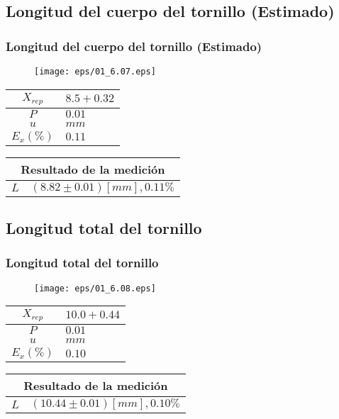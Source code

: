 \documentclass[letter,11pt]{beamer}
\begin{document}
\subsection{Longitud del cuerpo del tornillo (Estimado)}
\begin{frame}
\frametitle{Longitud del cuerpo del tornillo (Estimado)}
\vspace*{0.8cm}
\begin{figure}
\centering
\texttt{[image: eps/01\_6.07.eps]}
\end{figure}
\vspace*{0.4cm}
\scriptsize
\begin{tabular}{|c|>{\centering}m{1.8cm}<{\centering}|}
\hline
$X_{rep}$ &  $8.5+0.32$ \tabularnewline \hline
      $P$ &      $0.01$ \tabularnewline \hline
      $u$ &        $mm$ \tabularnewline \hline
$E_x(\%)$ &      $0.11$ \tabularnewline \hline
\end{tabular}
\quad
\begin{tabular}{|c|>{\centering}m{5.7cm}<{\centering}|}
\hline
\multicolumn{2}{|c|}{\textbf{Resultado de la medición}} \\ \hline
$L$ & $( 8.82\pm0.01)[mm], 0.11\%$ \tabularnewline \hline
\end{tabular}
\end{frame}

\subsection{Longitud total del tornillo}
\begin{frame}
\frametitle{Longitud total del tornillo}
\vspace*{0.8cm}
\begin{figure}
\centering
\texttt{[image: eps/01\_6.08.eps]}
\end{figure}
\vspace*{0.4cm}
\scriptsize
\begin{tabular}{|c|>{\centering}m{1.8cm}<{\centering}|}
\hline
$X_{rep}$ &  $10.0+0.44$ \tabularnewline \hline
      $P$ &       $0.01$ \tabularnewline \hline
      $u$ &         $mm$ \tabularnewline \hline
$E_x(\%)$ &       $0.10$ \tabularnewline \hline
\end{tabular}
\quad
\begin{tabular}{|c|>{\centering}m{5.7cm}<{\centering}|}
\hline
\multicolumn{2}{|c|}{\textbf{Resultado de la medición}} \\ \hline
$L$ & $(10.44\pm0.01)[mm], 0.10\%$ \tabularnewline \hline
\end{tabular}
\end{frame}
\end{document}
